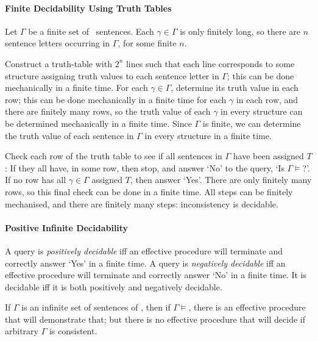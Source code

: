 \paragraph{Finite Decidability Using Truth Tables}

Let $\Gamma$ be a finite set of \lone\ sentences. Each $\gamma\in\Gamma$ is only finitely long, so there are $n$ sentence letters occurring in $\Gamma$, for some finite $n$.

Construct a truth-table with $2^{n}$ lines such that each line corresponds to some structure assigning truth values to each sentence letter in $\Gamma$; this can be done mechanically in a finite time. For each $\gamma \in \Gamma$, determine its truth value in each row; this can be done mechanically in a finite time for each $\gamma$ in each row, and there are finitely many rows, so the truth value of each $\gamma$ in every structure can be determined mechanically in a finite time. Since $\Gamma$ is finite, we can determine the truth value of each sentence in $\Gamma$ in every structure in a finite time. 

Check each row of the truth table to see if all sentences in $\Gamma$ have been assigned $T$: If they all have, in some row, then stop, and answer `No' to the query, `Is $\Gamma\vDash$?'. If no row has all $\gamma\in\Gamma$ assigned $T$, then answer `Yes'. There are only finitely many rows, so this final check can be done in a finite time. All steps can be finitely mechanised, and there are finitely many steps: inconsistency is decidable.

\paragraph{Positive Infinite Decidability}

A query is \emph{positively decidable} iff an effective procedure will terminate and correctly answer `Yes' in a finite time. A query is \emph{negatively decidable} iff an effective procedure will terminate and correctly answer `No' in a finite time. It is decidable iff it is both positively and negatively decidable.

\begin{theorem}
If $\Gamma$ is an infinite set of sentences of \lone, then if $\Gamma\vDash$, there is an effective procedure that will demonstrate that; but there is no effective procedure that will
decide if arbitrary $\Gamma$ is consistent.\end{theorem}

